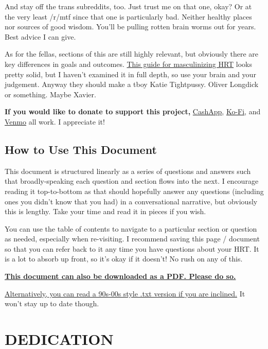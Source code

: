 \documentclass{article}
\begin{document}
And stay off the trans subreddits, too. Just trust me on that one, okay? Or at the very least /r/mtf since that one is particularly bad. Neither healthy places nor sources of good wisdom. You’ll be pulling rotten brain worms out for years. Best advice I can give.

As for the fellas, sections of this are still highly relevant, but obviously there are key differences in goals and outcomes. \href{https://mega.nz/folder/cfwSmBbY#ify6kaueB8SdDD1v12t2Dw}{This guide for masculinizing HRT} looks pretty solid, but I haven’t examined it in full depth, so use your brain and your judgement. Anyway they should make a tboy Katie Tightpussy. Oliver Longdick or something. Maybe Xavier.

\textbf{If you would like to donate to support this project,} \href{https://cash.app/Katitties}{CashApp}, \href{https://ko-fi.com/katitties}{Ko-Fi}, and \href{https://account.venmo.com/u/katitties}{Venmo} all work. I appreciate it!

\subsection*{How to Use This Document}

This document is structured linearly as a series of questions and answers such that broadly-speaking each question and section flows into the next. I encourage reading it top-to-bottom as that should hopefully answer any questions (including ones you didn’t know that you had) in a conversational narrative, but obviously this is lengthy. Take your time and read it in pieces if you wish.

You can use the table of contents to navigate to a particular section or question as needed, especially when re-visiting. I recommend saving this page / document so that you can refer back to it any time you have questions about your HRT. It is a lot to absorb up front, so it’s okay if it doesn’t! No rush on any of this.

\noindent\textbf{\href{PDF_LINK}{This document can also be downloaded as a PDF. Please do so.}}

\noindent\href{https://pghrt.diy/pghrtgretchensversion.txt}{Alternatively, you can read a 90s-00s style .txt version if you are inclined.} It won't stay up to date though.



\section*{DEDICATION}
\end{document}
